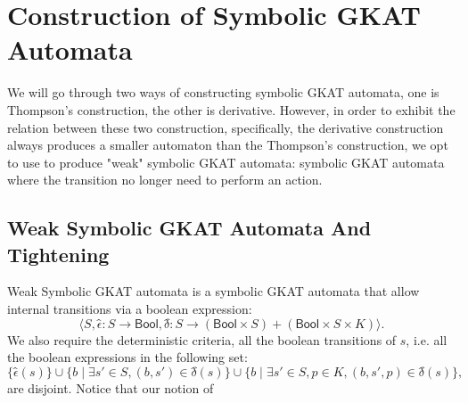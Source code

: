 \documentclass{extarticle}
\newcommand{\theoryOf}[1]{\ensuremath{\mathsf{#1}}}
\newcommand{\Bool}{\theoryOf{Bool}}
\begin{document}
\section{Construction of Symbolic GKAT Automata}

We will go through two ways of constructing symbolic GKAT automata, one is Thompson's construction, the other is derivative.
However, in order to exhibit the relation between these two construction, specifically, the derivative construction always produces a smaller automaton than the Thompson's construction, we opt to use to produce "weak" symbolic GKAT automata: symbolic GKAT automata where the transition no longer need to perform an action.

\subsection{Weak Symbolic GKAT Automata And Tightening}

Weak Symbolic GKAT automata is a symbolic GKAT automata that allow internal transitions via a boolean expression:
\[⟨S, 
ϵ̂: S → \Bool, 
δ̂: S → (\Bool × S) + (\Bool × S × K)⟩.\]
We also require the deterministic criteria, all the boolean transitions of \(s\), i.e. all the boolean expressions in the following set:
\[\{ϵ̂(s)\} ∪ 
\{b ∣ ∃ s' ∈ S, (b, s') ∈ δ̂(s)\} ∪ 
\{b ∣ ∃ s' ∈ S, p ∈ K, (b, s', p) ∈ δ̂(s)\},\]
are disjoint.
Notice that our notion of 



















\end{document}
